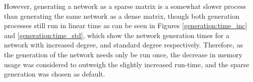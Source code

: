 \documentclass[a4paper, 12pt]{report}
\begin{document}
However, generating a network as a sparse matrix is a somewhat slower process than generating the same network as a dense matrix, though both generation processes still run in linear time as can be seen in Figures \ref{generation:time_inc} and \ref{generation:time_std},  which show the network generation times for a network with increased degree, and standard degree respectively. Therefore, as the generation of the network needs only be run once, the decrease in memory usage was considered to outweigh the slightly increased run-time, and the sparse generation was chosen as default.
\begin{figure}[!htbp]
    \centering
    

\end{figure}
\end{document}
